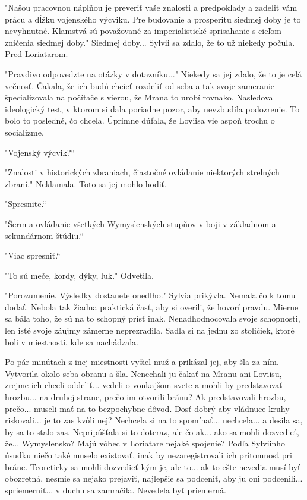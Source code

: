 \documentclass{book}
\begin{document}
"$ $Našou pracovnou náplňou je preveriť vaše znalosti a predpoklady a zadeliť vám prácu a dĺžku vojenského výcviku. Pre budovanie a prosperitu siedmej doby je to nevyhnutné. Klamstvá sú považované za imperialistické sprisahanie s cieľom zničenia siedmej doby."$ $ Siedmej doby... Sylvii sa zdalo, že to už niekedy počula. Pred Loriatarom.

"$ $Pravdivo odpovedzte na otázky v dotazníku..."$ $ Niekedy sa jej zdalo, že to je celá večnosť. Čakala, že ich budú chcieť rozdeliť od seba a tak svoje zameranie špecializovala na počítače s vierou, že Mrana to urobí rovnako. Nasledoval ideologický test, v ktorom si dala poriadne pozor, aby nevzbudila podozrenie. To bolo to posledné, čo chcela. Úprimne dúfala, že Loviisa vie aspoň trochu o socializme.

"$ $Vojenský výcvik?“

"$ $Znalosti v historických zbraniach, čiastočné ovládanie niektorých strelných zbraní."$ $ Neklamala. Toto sa jej mohlo hodiť.

"$ $Spresnite.“

"$ $Šerm a ovládanie všetkých Wymyslenských stupňov v boji v základnom a sekundárnom štúdiu.“

"$ $Viac spresniť.“

"$ $To sú meče, kordy, dýky, luk."$ $ Odvetila.

"$ $Porozumenie. Výsledky dostanete onedlho."$ $ Sylvia prikývla. Nemala čo k tomu dodať. Nebola tak žiadna praktická časť, aby si overili, že hovorí pravdu. Mierne sa bála toho, že sú na to schopný prísť inak. Nenadhodnocovala svoje schopnosti, len isté svoje záujmy zámerne neprezradila. Sadla si na jednu zo stoličiek, ktoré boli v miestnosti, kde sa nachádzala.

Po pár minútach z inej miestnosti vyšiel muž a prikázal jej, aby šla za ním. Vytvorila okolo seba obranu a šla. Nenechali ju čakať na Mranu ani Loviisu, zrejme ich chceli oddeliť... vedeli o vonkajšom svete a mohli by predstavovať hrozbu... na druhej strane, prečo im otvorili bránu? Ak predstavovali hrozbu, prečo... museli mať na to bezpochybne dôvod. Dosť dobrý aby vládnuce kruhy riskovali... je to zas kvôli nej? Nechcela si na to spomínať... nechcela... a desila sa, by sa to stalo zas. Nepripúšťala si to doteraz, ale čo ak... ako sa mohli dozvedieť, že... Wymyslensko? Majú vôbec v Loriatare nejaké spojenie? Podľa Sylviinho úsudku niečo také muselo existovať, inak by nezaregistrovali ich prítomnosť pri bráne. Teoreticky sa mohli dozvedieť kým je, ale to... ak to ešte nevedia musí byť obozretná, nesmie sa nejako prejaviť, najlepšie sa podceniť, aby ju oni podcenili... spriemerniť... v duchu sa zamračila. Nevedela byť priemerná.
\end{document}
